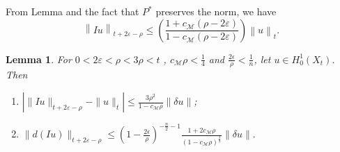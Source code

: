 \documentclass[10 pt, reqno]{amsart}
\newtheorem{lemma}[theorem]{Lemma}
\theoremstyle{definition}
\numberwithin{equation}{section}
\newcommand{\MMM}{\mathcal{M}}
\newcommand{\norm}[1]{\left\lVert#1\right\rVert}
\begin{document}
From Lemma  and the fact that $P^*$ preserves the norm, we have \begin{equation*}
 \norm{Iu}_{t+2\varepsilon-\rho}\leq \left(\frac{1+
 c_\MMM (\rho-2\varepsilon)}{1-c_\MMM(\rho-2\varepsilon)}\right)\norm{u}_{t}.  
\end{equation*}
\begin{lemma}
\label{lem:interpolation}For $0<2\varepsilon<\rho<3\rho<t$ , $c_\MMM \rho<\frac{1}{4}$ and $\frac{2\epsilon}{\rho}<\frac{1}{n}$, let $u\in H^1_0(X_t)$. Then
    \begin{enumerate}
        \item $|\|Iu\|_{t+2\varepsilon-\rho}-\|u\|_{t}|\le \frac{3\rho^2}{1-c_{\MMM}\rho} \|\delta u\|$;
        \item $\|d(Iu)\|_{t+2\varepsilon-\rho}\le \left(1-\frac{2\epsilon}{\rho}\right)^{-\frac{n}{2}-1} \frac{1+ 2c_\MMM \rho}{(1-c_\MMM \rho)^\frac{3}{2}}\|\delta u\|.$

    \end{enumerate}
\end{lemma}
\end{document}
